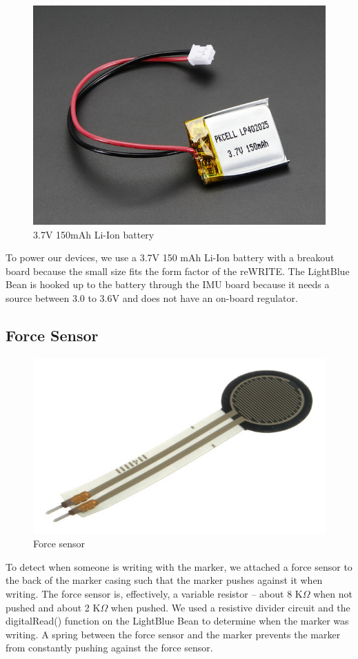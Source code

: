 \documentclass[10pt,journal]{IEEEtran}
\begin{document}
\begin{figure}[h]
  \centering
    \includegraphics[width=0.6\linewidth]{figures/battery}
  \caption{3.7V 150mAh Li-Ion battery}
  \label{fig:battery}
\end{figure}
  To power our devices, we use a 3.7V 150 mAh Li-Ion battery with a breakout board because the small size fits the form factor of the reWRITE. The LightBlue Bean is hooked up to the battery through the IMU board because it needs a source between 3.0 to 3.6V and does not have an on-board regulator.

\subsection{Force Sensor}

\begin{figure}[H]
  \centering
    \includegraphics[width=0.6\linewidth]{figures/force-sensor}
  \caption{Force sensor}
  \label{fig:system}
\end{figure}
  To detect when someone is writing with the marker, we attached a force sensor to the back of the marker casing such that the marker pushes against it when writing. The force sensor is, effectively, a variable resistor -- about 8 K$\Omega$ when not pushed and about 2 K$\Omega$ when pushed. We used a resistive divider circuit and the digitalRead() function on the LightBlue Bean to determine when the marker was writing. A spring between the force sensor and the marker prevents the marker from constantly pushing against the force sensor.
\end{document}
